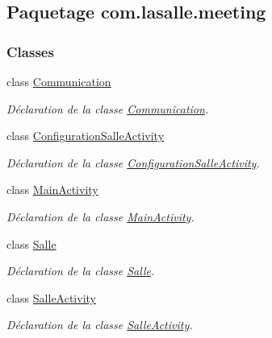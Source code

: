 \hypertarget{namespacecom_1_1lasalle_1_1meeting}{}\subsection{Paquetage com.\+lasalle.\+meeting}
\label{namespacecom_1_1lasalle_1_1meeting}
\subsubsection*{Classes}
\begin{DoxyCompactItemize}
\item 
class \hyperlink{classcom_1_1lasalle_1_1meeting_1_1_communication}{Communication}
\begin{DoxyCompactList}\small\item\em Déclaration de la classe \hyperlink{classcom_1_1lasalle_1_1meeting_1_1_communication}{Communication}. \end{DoxyCompactList}\item 
class \hyperlink{classcom_1_1lasalle_1_1meeting_1_1_configuration_salle_activity}{Configuration\+Salle\+Activity}
\begin{DoxyCompactList}\small\item\em Déclaration de la classe \hyperlink{classcom_1_1lasalle_1_1meeting_1_1_configuration_salle_activity}{Configuration\+Salle\+Activity}. \end{DoxyCompactList}\item 
class \hyperlink{classcom_1_1lasalle_1_1meeting_1_1_main_activity}{Main\+Activity}
\begin{DoxyCompactList}\small\item\em Déclaration de la classe \hyperlink{classcom_1_1lasalle_1_1meeting_1_1_main_activity}{Main\+Activity}. \end{DoxyCompactList}\item 
class \hyperlink{classcom_1_1lasalle_1_1meeting_1_1_salle}{Salle}
\begin{DoxyCompactList}\small\item\em Déclaration de la classe \hyperlink{classcom_1_1lasalle_1_1meeting_1_1_salle}{Salle}. \end{DoxyCompactList}\item 
class \hyperlink{classcom_1_1lasalle_1_1meeting_1_1_salle_activity}{Salle\+Activity}
\begin{DoxyCompactList}\small\item\em Déclaration de la classe \hyperlink{classcom_1_1lasalle_1_1meeting_1_1_salle_activity}{Salle\+Activity}. \end{DoxyCompactList}\item 

\end{DoxyCompactItemize}
